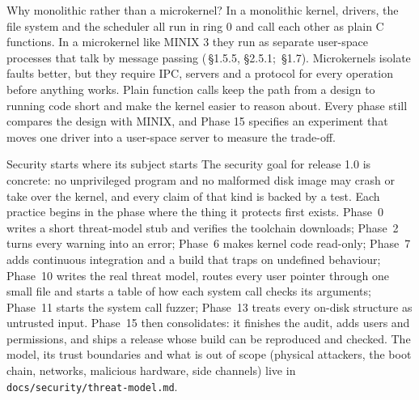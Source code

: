 \documentclass[11pt,a4paper]{article}
\begin{document}
\begin{decisionbox}{Why monolithic rather than a microkernel?}
In a monolithic kernel, drivers, the file system and the scheduler all run in ring 0 and call each other as plain C
functions. In a microkernel like MINIX 3 they run as separate user-space processes that talk by message passing
(\OSDI\,\S1.5.5, \S2.5.1; \MOS\,\S1.7). Microkernels isolate faults better, but they require IPC, servers and a
protocol for every operation before anything works. Plain function calls keep the path from a design to running code
short and make the kernel easier to reason about. Every phase still compares the design with MINIX, and Phase 15
specifies an experiment that moves one driver into a user-space server to measure the trade-off.
\end{decisionbox}

\begin{decisionbox}{Security starts where its subject starts}
The security goal for release 1.0 is concrete: no unprivileged program and
no malformed disk image may crash or take over the kernel, and every claim of that kind is backed by a test. Each
practice begins in the phase where the thing it protects first exists. Phase~0 writes a short threat-model stub and
verifies the toolchain downloads; Phase~2 turns every warning into an error; Phase~6 makes kernel code read-only;
Phase~7 adds continuous integration and a build that traps on undefined behaviour; Phase~10 writes the real threat
model, routes every user pointer through one small file and starts a table of how each system call checks its
arguments; Phase~11 starts the system call fuzzer; Phase~13 treats every on-disk structure as untrusted input.
Phase~15 then consolidates: it finishes the audit, adds users and permissions, and ships a release whose build can
be reproduced and checked. The model, its trust boundaries and what is out of scope (physical attackers, the boot
chain, networks, malicious hardware, side channels) live in \texttt{docs/security/threat-model.md}.
\end{decisionbox}
\end{document}
